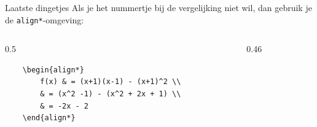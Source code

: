 \begin{frame}[fragile]{Laatste dingetjes}
Als je het nummertje bij de vergelijking niet wil, dan gebruik je de 
\texttt{align*}-omgeving:
\begin{columns}[t]
    \begin{column}{0.5\textwidth}
    \begin{verbatim}
    \begin{align*}
        f(x) & = (x+1)(x-1) - (x+1)^2 \\
        & = (x^2 -1) - (x^2 + 2x + 1) \\
        & = -2x - 2
    \end{align*}
    \end{verbatim}
    \par
\end{column}

\begin{column}{0.46\textwidth}
    \vspace{1mm}
\end{column}
\end{columns}
\end{frame}